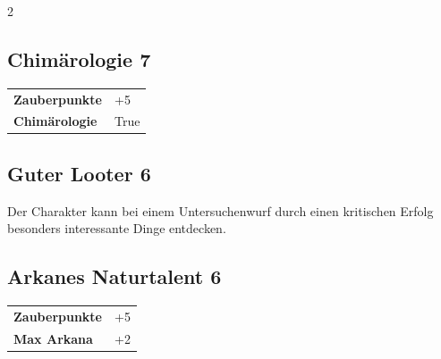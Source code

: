 \begin{multicols}{2}
\begin{tcolorbox}

\end{tcolorbox}

\begin{tcolorbox}
    \subsection*{Chimärologie \hfill \small{7 }}
    \tcblower




\begin{tabular}{@{}ll@{}}
    \textbf{Zauberpunkte} & +5\\
    \textbf{Chimärologie} & True\\
\end{tabular}


\end{tcolorbox}

\begin{tcolorbox}
    \subsection*{Guter Looter \hfill \small{6 }}
    \tcblower
Der Charakter kann bei einem Untersuchenwurf durch einen kritischen Erfolg besonders interessante  Dinge entdecken.


\vspace{3mm}



\end{tcolorbox}

\begin{tcolorbox}
    \subsection*{Arkanes Naturtalent \hfill \small{6 }}
    \tcblower




\begin{tabular}{@{}ll@{}}
    \textbf{Zauberpunkte} & +5\\
    \textbf{Max Arkana} & +2\\
\end{tabular}


\end{tcolorbox}
\end{multicols}
